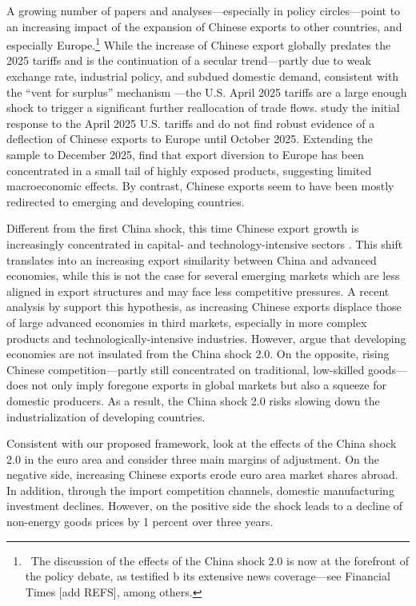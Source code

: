 \documentclass[english,12pt]{article}
\theoremstyle{definition}
\begin{document}
A growing number of papers and analyses---especially in policy circles---point to an increasing impact of the expansion of Chinese exports to other countries, and especially Europe.\footnote{\ The discussion of the effects of the China shock 2.0 is now at the forefront of the policy debate, as testified b its extensive news coverage---see Financial Times [add REFS], among others.} While the increase of Chinese export globally predates the 2025 tariffs and is the continuation of a secular trend---partly due to weak exchange rate, industrial policy, and subdued domestic demand, consistent with the ``vent for surplus'' mechanism \citep{almunia2021}---the U.S. April 2025 tariffs are a large enough shock to trigger a significant further reallocation of trade flows. 
\citet{Emlinger2026} study the initial response to the April 2025 U.S. tariffs and do not find robust evidence of a deflection of Chinese exports to Europe until October 2025. Extending the sample to December 2025, \citet{Schulte2026} find that export diversion to Europe has been concentrated in a small tail of highly exposed products, suggesting limited macroeconomic effects. By contrast, Chinese exports seem to have been mostly redirected to emerging and developing countries. 

Different from the first China shock, this time Chinese export growth is increasingly concentrated in capital- and technology-intensive sectors \citep{deSoyres2026}. This shift translates into an increasing export similarity between China and advanced economies, while this is not the case for several emerging markets which are less aligned in export structures and may face less competitive pressures. A recent analysis by \citet{kiel2026} support this hypothesis, as increasing Chinese exports displace those of large advanced economies in third markets, especially in more complex products and technologically-intensive industries. However, \citet{chatterjee2026} argue that developing economies are not insulated from the China shock 2.0. On the opposite, rising Chinese competition---partly still concentrated on traditional, low-skilled goods---does not only imply foregone exports in global markets but also a squeeze for domestic producers. As a result, the China shock 2.0 risks slowing down the industrialization of developing countries.

Consistent with our proposed framework, \citet{aprigliano2026} look at the effects of the China shock 2.0 in the euro area and consider three main margins of adjustment. On the negative side, increasing Chinese exports erode euro area market shares abroad. In addition, through the import competition channels, domestic manufacturing investment declines. However, on the positive side the shock leads to a decline of non-energy goods prices by 1 percent over three years.
\end{document}
